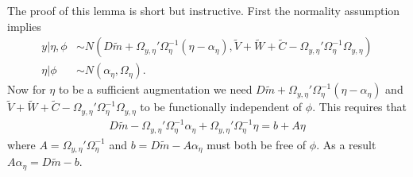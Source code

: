 \documentclass[12pt]{article}
\begin{document}
The proof of this lemma is short but instructive. First the normality assumption implies
\begin{align*}
  y|\eta,\phi &\sim N(D\tilde{m} + \Omega_{y,\eta}'\Omega_\eta^{-1}(\eta - \alpha_\eta), \tilde{V} + \tilde{W} + \tilde{C}- \Omega_{y,\eta}'\Omega_{\eta}^{-1}\Omega_{y,\eta})\\
  \eta|\phi &\sim N(\alpha_\eta, \Omega_\eta).
\end{align*}
Now for $\eta$ to be a sufficient augmentation we need $D\tilde{m} + \Omega_{y,\eta}'\Omega_\eta^{-1}(\eta - \alpha_\eta)$ and $\tilde{V} + \tilde{W} + \tilde{C} - \Omega_{y,\eta}'\Omega_{\eta}^{-1}\Omega_{y,\eta}$ to be functionally independent of $\phi$. This requires that
\begin{align*}
  D\tilde{m} - \Omega_{y,\eta}'\Omega_\eta^{-1}\alpha_\eta + \Omega_{y,\eta}'\Omega_\eta^{-1}\eta  = b + A\eta
\end{align*}
where $A=\Omega_{y,\eta}'\Omega_\eta^{-1}$ and $b=D\tilde{m} - A\alpha_\eta$ must both be free of $\phi$. As a result $A\alpha_\eta = D\tilde{m} - b$.
\end{document}
